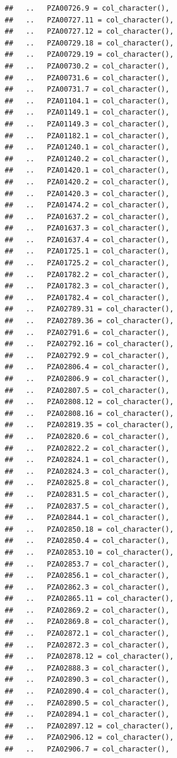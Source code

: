 \documentclass[
]{article}
\begin{document}
\begin{verbatim}
##   ..   PZA00726.9 = col_character(),
##   ..   PZA00727.11 = col_character(),
##   ..   PZA00727.12 = col_character(),
##   ..   PZA00729.18 = col_character(),
##   ..   PZA00729.19 = col_character(),
##   ..   PZA00730.2 = col_character(),
##   ..   PZA00731.6 = col_character(),
##   ..   PZA00731.7 = col_character(),
##   ..   PZA01104.1 = col_character(),
##   ..   PZA01149.1 = col_character(),
##   ..   PZA01149.3 = col_character(),
##   ..   PZA01182.1 = col_character(),
##   ..   PZA01240.1 = col_character(),
##   ..   PZA01240.2 = col_character(),
##   ..   PZA01420.1 = col_character(),
##   ..   PZA01420.2 = col_character(),
##   ..   PZA01420.3 = col_character(),
##   ..   PZA01474.2 = col_character(),
##   ..   PZA01637.2 = col_character(),
##   ..   PZA01637.3 = col_character(),
##   ..   PZA01637.4 = col_character(),
##   ..   PZA01725.1 = col_character(),
##   ..   PZA01725.2 = col_character(),
##   ..   PZA01782.2 = col_character(),
##   ..   PZA01782.3 = col_character(),
##   ..   PZA01782.4 = col_character(),
##   ..   PZA02789.31 = col_character(),
##   ..   PZA02789.36 = col_character(),
##   ..   PZA02791.6 = col_character(),
##   ..   PZA02792.16 = col_character(),
##   ..   PZA02792.9 = col_character(),
##   ..   PZA02806.4 = col_character(),
##   ..   PZA02806.9 = col_character(),
##   ..   PZA02807.5 = col_character(),
##   ..   PZA02808.12 = col_character(),
##   ..   PZA02808.16 = col_character(),
##   ..   PZA02819.35 = col_character(),
##   ..   PZA02820.6 = col_character(),
##   ..   PZA02822.2 = col_character(),
##   ..   PZA02824.1 = col_character(),
##   ..   PZA02824.3 = col_character(),
##   ..   PZA02825.8 = col_character(),
##   ..   PZA02831.5 = col_character(),
##   ..   PZA02837.5 = col_character(),
##   ..   PZA02844.1 = col_character(),
##   ..   PZA02850.18 = col_character(),
##   ..   PZA02850.4 = col_character(),
##   ..   PZA02853.10 = col_character(),
##   ..   PZA02853.7 = col_character(),
##   ..   PZA02856.1 = col_character(),
##   ..   PZA02862.3 = col_character(),
##   ..   PZA02865.11 = col_character(),
##   ..   PZA02869.2 = col_character(),
##   ..   PZA02869.8 = col_character(),
##   ..   PZA02872.1 = col_character(),
##   ..   PZA02872.3 = col_character(),
##   ..   PZA02878.12 = col_character(),
##   ..   PZA02888.3 = col_character(),
##   ..   PZA02890.3 = col_character(),
##   ..   PZA02890.4 = col_character(),
##   ..   PZA02890.5 = col_character(),
##   ..   PZA02894.1 = col_character(),
##   ..   PZA02897.12 = col_character(),
##   ..   PZA02906.12 = col_character(),
##   ..   PZA02906.7 = col_character(),

\end{verbatim}
\end{document}

